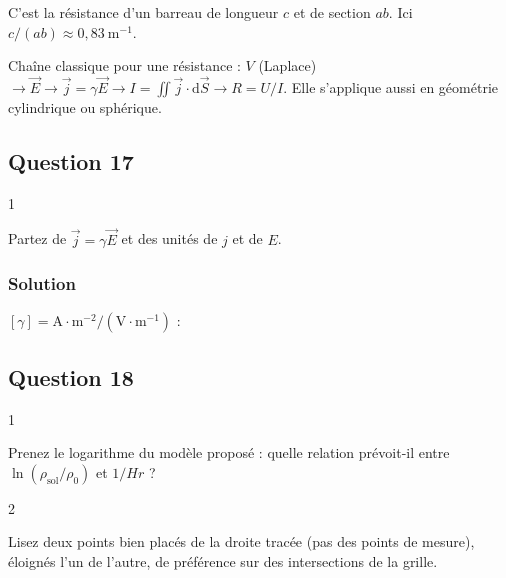 \documentclass[11pt,a4paper]{article}
\newcommand{\equationajustee}[1]{%
  \sbox{\boiteequation}{$\displaystyle #1$}%
  \ifdim\wd\boiteequation>\linewidth
    \[\resizebox{\linewidth}{!}{\usebox{\boiteequation}}\]%
  \else
    \[#1\]%
  \fi}
\begin{document}
C'est la résistance d'un barreau de longueur \(c\) et de section \(ab\). Ici \(c/(ab)\approx0{,}83\ \mathrm{m^{-1}}\).

\begin{methode}

Chaîne classique pour une résistance : \(V\) (Laplace) \(\to\vec E\to\vec j=\gamma\vec E\to I=\iint\vec j\cdot\mathrm d\vec S\to R=U/I\). Elle s'applique aussi en géométrie cylindrique ou sphérique.

\end{methode}

\hypertarget{question-17}{%
\subsection{Question 17}\label{question-17}}

\begin{indication}{1}

Partez de \(\vec j=\gamma\vec E\) et des unités de \(j\) et de \(E\).

\end{indication}

\hypertarget{solution-16}{%
\subsubsection{Solution}\label{solution-16}}

\([\gamma]=\mathrm{A\cdot m^{-2}}/(\mathrm{V\cdot m^{-1}})\) :

\equationajustee{\boxed{\gamma_{\text{sol}}\ \text{en}\ \mathrm{S\cdot m^{-1}}=\Omega^{-1}\cdot\mathrm m^{-1}}}

\hypertarget{question-18}{%
\subsection{Question 18}\label{question-18}}

\begin{indication}{1}

Prenez le logarithme du modèle proposé : quelle relation prévoit-il entre \(\ln(\rho_{\text{sol}}/\rho_0)\) et \(1/Hr\) ?

\end{indication}

\begin{indication}{2}

Lisez deux points bien placés de la droite tracée (pas des points de mesure), éloignés l'un de l'autre, de préférence sur des intersections de la grille.

\end{indication}
\end{document}
